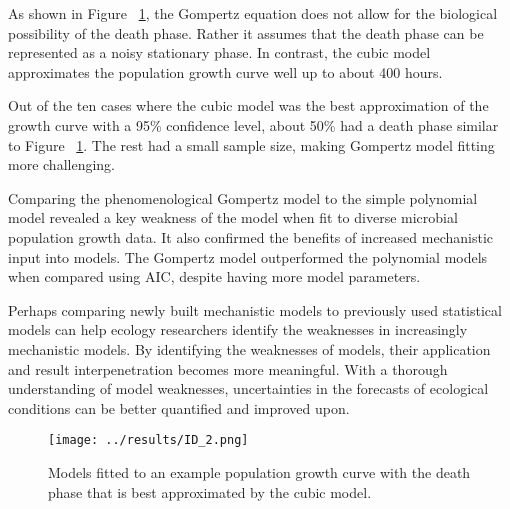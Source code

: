 \documentclass[11pt]{article}
\begin{document}
  As shown in Figure ~\ref{ID2}, the Gompertz equation does not allow for the biological possibility of the death phase. Rather it assumes that the death phase can be represented as  a noisy stationary phase. In contrast, the cubic model approximates the population growth curve well up to about 400 hours. 

  Out of the ten cases where the cubic model was the best approximation of the growth curve with a 95\% confidence level, about 50\% had a death phase similar to Figure ~\ref{ID2}.  The rest had a small sample size, making Gompertz model fitting more challenging. 

  Comparing the phenomenological Gompertz model to the simple polynomial model revealed a key weakness of the model when fit to diverse microbial population growth data. It also confirmed the benefits of increased mechanistic input into models. The Gompertz model  outperformed the polynomial models when compared using AIC, despite having more model parameters. 

  Perhaps  comparing newly built mechanistic models to previously used statistical models can help ecology researchers identify the  weaknesses  in increasingly mechanistic models. By identifying the weaknesses of models, their application and result interpenetration becomes more meaningful. With a thorough understanding of model weaknesses, uncertainties in the forecasts of ecological conditions can be better quantified and improved upon.
  
  \begin{figure}[!ht]
    \centering
    \texttt{[image: ../results/ID\_2.png]}
    \caption{Models fitted to an example population growth curve with the death phase that is best approximated by the cubic model.}
    \label{ID2}
   \end{figure}

  
  
  
\end{document}
